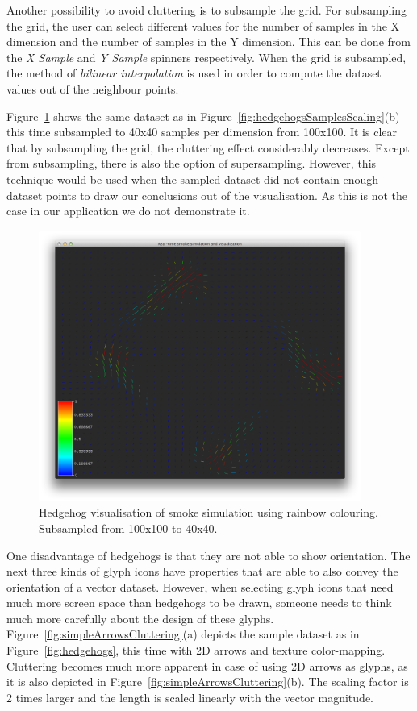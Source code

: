 Another possibility to avoid cluttering is to subsample the grid. For subsampling the grid, the user can select different values for the number of samples in the X dimension and the number of samples in the Y dimension. This can be done from the \emph{X Sample} and \emph{Y Sample} spinners respectively. When the grid is subsampled, the method of \emph{bilinear interpolation} is used in order to compute the dataset values out of the neighbour points.

Figure~\ref{fig:hedgehogsSubsampled} shows the same dataset as in Figure~\ref{fig:hedgehogsSamplesScaling}(b) this time subsampled to 40x40 samples per dimension from 100x100. It is clear that by subsampling the grid, the cluttering effect considerably decreases. Except from subsampling, there is also the option of supersampling. However, this technique would be used when the sampled dataset did not contain enough dataset points to draw our conclusions out of the visualisation. As this is not the case in our application we do not demonstrate it.

\begin{figure}[htbp]
\begin{center}
\includegraphics[height=3.5in]{figures/glyph/hedgehogsSubsampled.png}
\caption{Hedgehog visualisation of smoke simulation using rainbow colouring. Subsampled from 100x100 to 40x40.}
\label{fig:hedgehogsSubsampled}
\end{center}
\end{figure}

One disadvantage of hedgehogs is that they are not able to show orientation. The next three kinds of glyph icons have properties that are able to also convey the orientation of a vector dataset. However, when selecting glyph icons that need much more screen space than hedgehogs to be drawn, someone needs to think much more carefully about the design of these glyphs. Figure~\ref{fig:simpleArrowsCluttering}(a) depicts the sample dataset as in Figure~\ref{fig:hedgehogs}, this time with 2D arrows and texture color-mapping. Cluttering becomes much more apparent in case of using 2D arrows as glyphs, as it is also depicted in Figure~\ref{fig:simpleArrowsCluttering}(b). The scaling factor is 2 times larger and the length is scaled linearly with the vector magnitude.

